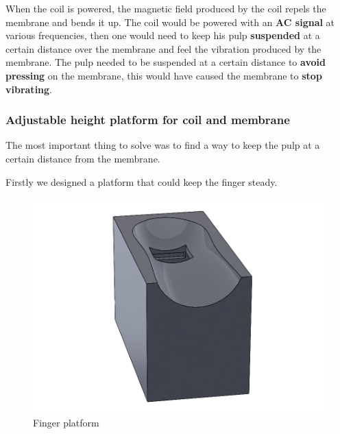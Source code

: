 When the coil is powered, the magnetic field produced by the coil repels the membrane and bends it up.
The coil would be powered with an \textbf{AC signal} at various frequencies, then one would need to keep his pulp \textbf{suspended} at a certain distance over the membrane and feel the vibration produced by the membrane.
The pulp needed to be suspended at a certain distance to \textbf{avoid pressing} on the membrane, this would have caused the membrane to \textbf{stop vibrating}.

\subsubsection{Adjustable height platform for coil and membrane}
The most important thing to solve was to find a way to keep the pulp at a certain distance from the membrane.

\begin{samepage}
    Firstly we designed a platform that could keep the finger steady.
    \nopagebreak

    \begin{figure}[H]
        \centering
        \includegraphics[width=0.5\linewidth]{Chapters/Chapter5/Rigid_Prototypes/Figures/finger_holder.png}
        \caption{Finger platform}
        \label{fig: finger_platform}
    \end{figure}
\end{samepage}

